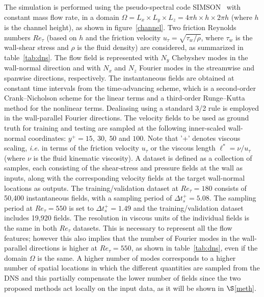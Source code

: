 The simulation is performed using the pseudo-spectral code SIMSON~\citep{chevalier2007pseudo} with constant mass flow rate, in a domain $\Omega = L_x \times L_y \times L_z = 4\pi h \times h \times 2\pi h$ (where $h$ is the channel height), as shown in figure~\ref{channel}.
Two friction Reynolds numbers $Re_{\tau}$ (based on $h$ and the friction velocity $u_{\tau}=\sqrt{\tau_w/\rho}$, where $\tau_w$ is the wall-shear stress and $\rho$ is the fluid density) are considered, as summarized in table~\ref{tab:dns}. The flow field is represented with $N_y$ Chebyshev modes in the wall-normal direction and with $N_x$ and $N_z$ Fourier modes in the streamwise and spanwise directions, respectively.
The instantaneous fields are obtained at constant time intervals from the time-advancing scheme, which is a second-order Crank--Nicholson scheme for the linear terms and a third-order Runge--Kutta method for the nonlinear terms.
Dealiasing using a standard 3/2 rule is employed in the wall-parallel Fourier directions.
The velocity fields to be used as ground truth for training and testing are sampled at the following inner-scaled wall-normal coordinates: $y^{+}=15,~30,~50$ and $100$.
Note that '+' denotes viscous scaling, {\it i.e.} in terms of the friction velocity $u_{\tau}$ or the viscous length $\ell^{*}=\nu / u_{\tau}$ (where $\nu$ is the fluid kinematic viscosity).
A dataset is defined as a collection of samples, each consisting of the shear-stress and pressure fields at the wall as inputs, along with the corresponding velocity fields at the target wall-normal locations as outputs.
The training/validation dataset at $Re_{\tau} = 180$ consists of 50,400 instantaneous fields, with a sampling period of $\Delta t^+_{s} = 5.08$.
The sampling period at $Re_{\tau} = 550$ is set to $\Delta t^+_{s} = 1.49$ and the training/validation dataset includes 19,920 fields.
The resolution in viscous units of the individual fields is the same in both $Re_{\tau}$ datasets.
This is necessary to represent all the flow features; however this also implies that the number of Fourier modes in the wall-parallel directions is higher at $Re_{\tau}=550$, as shown in table~\ref{tab:dns}, even if the domain $\Omega$ is the same.
A higher number of modes corresponds to a higher number of spatial locations in which the different quantities are sampled from the DNS and this partially compensate the lower number of fields since the two proposed methods act locally on the input data, as it will be shown in $\S$\ref{meth}.

